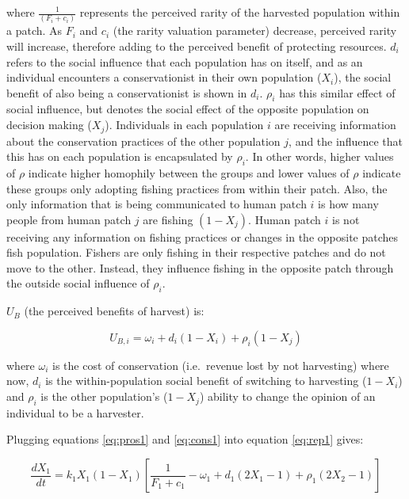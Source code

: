 \documentclass[
  12pt,
]{article}
\begin{document}
where \(\frac{1}{(F_i + c_i)}\) represents the perceived rarity of the harvested population within a patch. As \(F_i\) and \(c_i\) (the rarity valuation parameter) decrease, perceived rarity will increase, therefore adding to the perceived benefit of protecting resources. \(d_i\) refers to the social influence that each population has on itself, and as an individual encounters a conservationist in their own population (\(X_i\)), the social benefit of also being a conservationist is shown in \(d_i\). \(\rho_i\) has this similar effect of social influence, but denotes the social effect of the opposite population on decision making (\(X_j\)). Individuals in each population \(i\) are receiving information about the conservation practices of the other population \(j\), and the influence that this has on each population is encapsulated by \(\rho_i\). In other words, higher values of \(\rho\) indicate higher homophily between the groups and lower values of \(\rho\) indicate these groups only adopting fishing practices from within their patch. Also, the only information that is being communicated to human patch \(i\) is how many people from human patch \(j\) are fishing \((1 - X_j)\). Human patch \(i\) is not receiving any information on fishing practices or changes in the opposite patches fish population. Fishers are only fishing in their respective patches and do not move to the other. Instead, they influence fishing in the opposite patch through the outside social influence of \(\rho_i\).

\(U_B\) (the perceived benefits of harvest) is:

\begin{equation} 
U_{B,i} = \omega_i + d_i(1-X_i) + \rho_i(1-X_j)
  \label{eq:cons1}
\end{equation}

where \(\omega_i\) is the cost of conservation (i.e.~revenue lost by not harvesting) where now, \(d_i\) is the within-population social benefit of switching to harvesting (\(1-X_i\)) and \(\rho_i\) is the other population's (\(1-X_j\)) ability to change the opinion of an individual to be a harvester.

Plugging equations \eqref{eq:pros1} and \eqref{eq:cons1} into equation \eqref{eq:rep1} gives:

\begin{equation} 
\frac{dX_1}{dt} =  k_1X_1(1-X_1) [\frac{1}{F_1+c_1} - \omega_1 + d_1(2X_1 - 1) + \rho_1(2X_2 - 1)]
  \label{eq:social1}
\end{equation}
\end{document}
